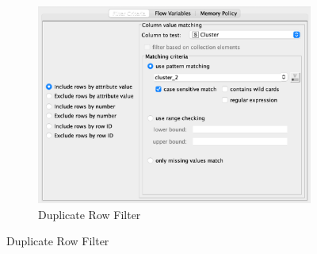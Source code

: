 \documentclass[11pt]{article}
\begin{document}
\begin{figure}[H]
\begin{subfigure}{0.4\textwidth}
					\includegraphics[width=\textwidth]{res/t1/t14/t14-row-filter-3-conf}
					\caption{Duplicate Row Filter}
					\label{fig:third}
				\end{subfigure}	
				\label{fig:figures}
			\end{figure}
			\fi
\end{document}
